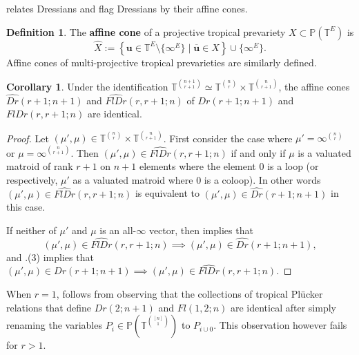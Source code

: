 \documentclass[11pt]{amsart}
\newcommand{\PP}{\mathbb P}
\newcommand{\TT}{\mathbb T}
\newcommand{\bu}{{\mathbf u}}
\theoremstyle{definition}
\newtheorem{cor}[thm]{Corollary}
\newtheorem{defn}[thm]{Definition}
\newcommand{\leon}[1]{{\color{teal} \sf Leon: [#1]}}
\newcommand{\chris}[1]{{\color{cyan} \sf Chris: [#1]}}
\begin{document}
 relates Dressians and flag Dressians by their affine cones.

\begin{defn}
The \textbf{affine cone} of a projective tropical prevariety $X \subset \PP(\TT^E)$ is
\[
\widehat X := \left\{ \bu \in \TT^E \setminus\{\infty^E\} \mid \overline{\bu}\in X\right\} \cup \{\infty^E\}.
\]
Affine cones of multi-projective tropical prevarieties are similarly defined.
\end{defn}

\begin{cor}\label{cor:affineconesame}
Under the identification $\TT^{n+1\choose r+1} \simeq \TT^{n\choose r} \times \TT^{n\choose r+1}$, the affine cones $\widehat{Dr}(r+1;n+1)$ and $\widehat{FlDr}(r,r+1;n)$ of $Dr(r+1;n+1)$ and $FlDr(r,r+1;n)$ are identical. 
\end{cor}

\begin{proof}
Let $(\mu',\mu) \in \TT^{n\choose r} \times \TT^{n\choose r+1}$.  First consider the case where $\mu' = \infty^{\binom{n}{r}}$ or $\mu = \infty^{\binom{n}{r+1}}$.  Then $(\mu',\mu) \in \widehat{FlDr}(r,r+1;n)$ if and only if $\mu$ is a valuated matroid of rank $r+1$ on $n+1$ elements where the element $0$ is a loop (or respectively, $\mu'$ as a valuated matroid where $0$ is a coloop).  In other words $(\mu',\mu) \in \widehat{FlDr}(r,r+1;n)$ is equivalent to $(\mu',\mu) \in \widehat{Dr}(r+1;n+1)$ in this case.

If neither of $\mu'$ and $\mu$ is an all-$\infty$ vector, then  implies that
\[
(\mu',\mu) \in \widehat{FlDr}(r,r+1;n) \implies (\mu',\mu)\in \widehat{Dr}(r+1;n+1),
\]
and .(3) implies that $(\mu',\mu) \in Dr(r+1;n+1) \implies (\mu',\mu)\in  \widehat{FlDr}(r,r+1;n)$.
\end{proof}

When $r=1$,  follows from observing that the collections of tropical Pl\"ucker relations that define $Dr(2;n+1)$ and $Fl(1,2;n)$ are identical after simply renaming the variables $P_i \in \PP(\TT^{[n]\choose 1})$ to $P_{i\cup 0}$.  This observation however fails for $r>1$.
\end{document}
